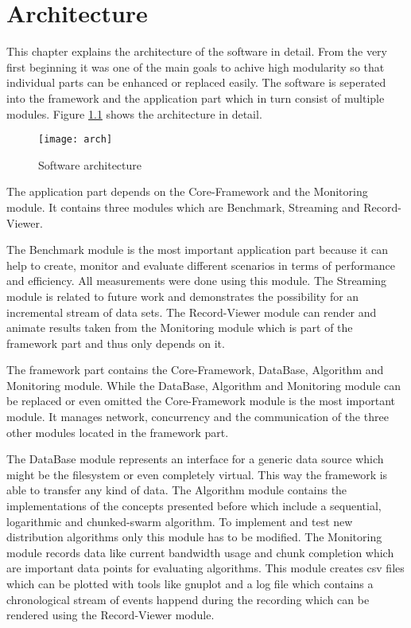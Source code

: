 \chapter{Architecture}

This chapter explains the architecture of the software in detail. From the very first beginning it was one of the main goals to achive high modularity so that individual parts can be enhanced or replaced easily. The software is seperated into the framework and the application part which in turn consist of multiple modules. Figure \ref{fig:arch} shows the architecture in detail.

\vspace{1cm}

\begin{figure}[ht]
\centering
\texttt{[image: arch]}
\caption{Software architecture}
\label{fig:arch}
\end{figure}

\clearpage

The application part depends on the Core-Framework and the Monitoring module. It contains three modules which are Benchmark, Streaming and Record-Viewer. 

The Benchmark module is the most important application part because it can help to create, monitor and evaluate different scenarios in terms of performance and efficiency. All measurements were done using this module. The Streaming module is related to future work and demonstrates the possibility for an incremental stream of data sets. The Record-Viewer module can render and animate results taken from the Monitoring module which is part of the framework part and thus only depends on it.

The framework part contains the Core-Framework, DataBase, Algorithm and Monitoring module. While the DataBase, Algorithm and Monitoring module can be replaced or even omitted the Core-Framework module is the most important module. It manages network, concurrency and the communication of the three other modules located in the framework part. 

The DataBase module represents an interface for a generic data source which might be the filesystem or even completely virtual. This way the framework is able to transfer any kind of data. The Algorithm module contains the implementations of the concepts presented before which include a sequential, logarithmic and chunked-swarm algorithm. To implement and test new distribution algorithms only this module has to be modified. The Monitoring module records data like current bandwidth usage and chunk completion which are important data points for evaluating algorithms. This module creates csv files which can be plotted with tools like gnuplot and a log file which contains a chronological stream of events happend during the recording which can be rendered using the Record-Viewer module.

